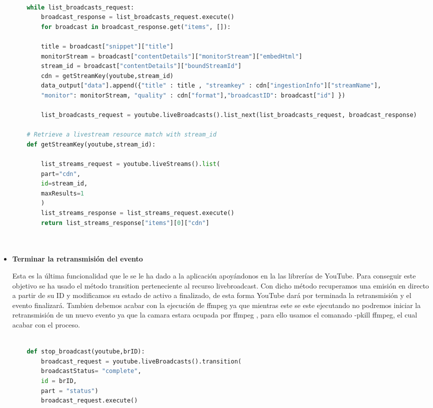 \begin{itemize}
    \begin{lstlisting}[language =Python]
    
    while list_broadcasts_request:
        broadcast_response = list_broadcasts_request.execute()
        for broadcast in broadcast_response.get("items", []):
    
        title = broadcast["snippet"]["title"]
        monitorStream = broadcast["contentDetails"]["monitorStream"]["embedHtml"]
        stream_id = broadcast["contentDetails"]["boundStreamId"]
        cdn = getStreamKey(youtube,stream_id)
        data_output["data"].append({"title" : title , "streamkey" : cdn["ingestionInfo"]["streamName"],
        "monitor": monitorStream, "quality" : cdn["format"],"broadcastID": broadcast["id"] })

        list_broadcasts_request = youtube.liveBroadcasts().list_next(list_broadcasts_request, broadcast_response)
    
    # Retrieve a livestream resource match with stream_id
    def getStreamKey(youtube,stream_id):
    
        list_streams_request = youtube.liveStreams().list(
        part="cdn",
        id=stream_id,
        maxResults=1
        )
        list_streams_response = list_streams_request.execute()
        return list_streams_response["items"][0]["cdn"]

    
    \end{lstlisting}
    
    \item \textbf{Terminar la retransmisión del evento}
    
    Esta es la última funcionalidad que le se le ha dado a la aplicación apoyándonos en la las librerías de YouTube. Para conseguir este objetivo se ha usado el método transition perteneciente al recurso livebroadcast. Con dicho método recuperamos una emisión en directo a partir de su ID y modificamos su estado de activo a finalizado, de esta forma YouTube dará por terminada la retransmisión y el evento finalizará. Tambien debemos acabar con la ejecución de ffmpeg ya que mientras este se este ejecutando no podremos iniciar la retransmisión de un nuevo evento ya que la camara estara ocupada por ffmpeg , para ello usamos el comanado -pkill ffmpeg, el cual acabar con el proceso.
    \\
    
    \begin{lstlisting}[language = Python]
    
    def stop_broadcast(youtube,brID):
        broadcast_request = youtube.liveBroadcasts().transition(
        broadcastStatus= "complete",
        id = brID,
        part = "status")
        broadcast_request.execute()
    

\end{lstlisting}
\end{itemize}
